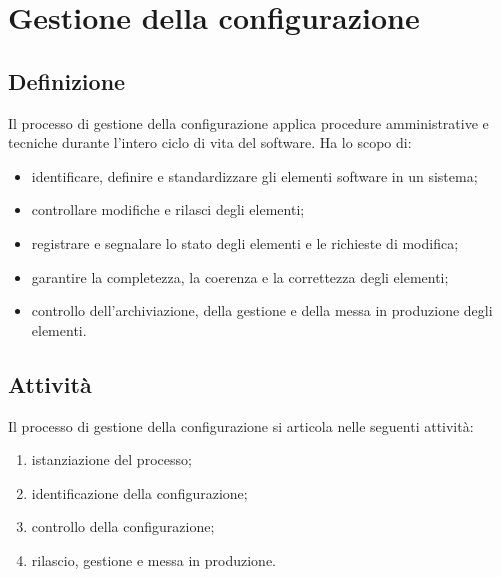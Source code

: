 \section{Gestione della configurazione} \label{sec:gestconf}
\subsection{Definizione}

Il processo di gestione della configurazione applica procedure amministrative e tecniche durante l'intero ciclo di vita del software. Ha lo scopo di:
\begin{itemize}
    \item identificare, definire e standardizzare gli elementi software in un sistema;
    \item controllare modifiche e rilasci degli elementi;
    \item registrare e segnalare lo stato degli elementi e le richieste di modifica;
    \item garantire la completezza, la coerenza e la correttezza degli elementi;
    \item controllo dell'archiviazione, della gestione e della messa in produzione degli elementi.
\end{itemize}
\subsection{Attività}
Il processo di gestione della configurazione si articola nelle seguenti attività:
\begin{enumerate}
    \item istanziazione del processo;
    \item identificazione della configurazione;
    \item controllo della configurazione;
    \item rilascio, gestione e messa in produzione.
\end{enumerate}
